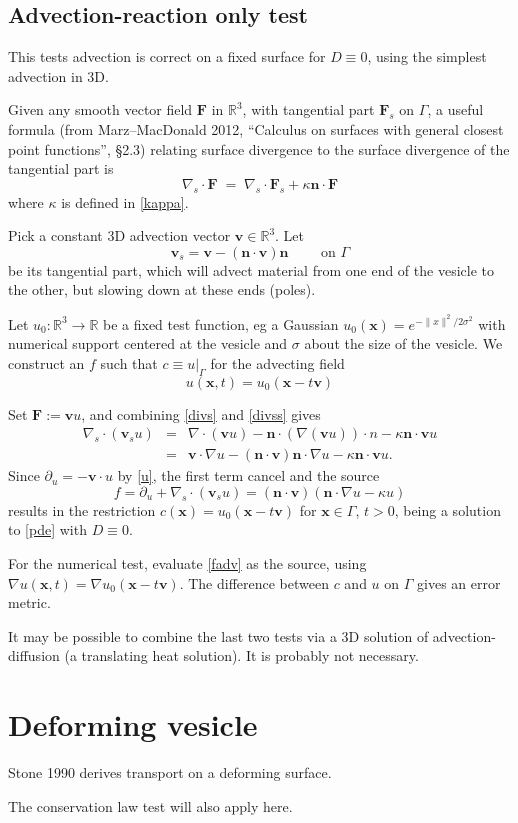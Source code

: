 \documentclass[11pt]{article}
\newcommand{\be}{\begin{equation}}
\newcommand{\ee}{\end{equation}}
\newcommand{\bea}{\begin{eqnarray}}
\newcommand{\eea}{\end{eqnarray}}
\newcommand{\mbf}[1]{{\mathbf #1}}
\newcommand{\R}{\mathbb{R}}
\newcommand{\x}{\mbf{x}}
\newcommand{\n}{\mbf{n}}
\newcommand{\vv}{\mbf{v}}
\begin{document}
\subsection{Advection-reaction only test}

This tests advection is correct on a fixed surface for $D\equiv 0$,
using the simplest advection in 3D.

Given any smooth vector field $\mbf{F}$ in $\R^3$, with tangential part
$\mbf{F}_s$ on $\Gamma$,
a useful formula (from Marz--MacDonald 2012, ``Calculus on surfaces with general closest point functions'', \S2.3)
relating surface divergence to the surface divergence of the tangential part is
\be
\nabla_s \cdot \mbf{F}
\;=\;
\nabla_s \cdot \mbf{F}_s + \kappa \n\cdot \mbf{F}
\label{divss}
\ee
where $\kappa$ is defined in \eqref{kappa}.

Pick a constant 3D advection vector $\vv\in\R^3$.
Let
$$
\vv_s = \vv - (\n\cdot\vv)\n  \qquad \mbox{ on } \Gamma
$$
be its tangential part, which will advect material
from one end of the vesicle to the other, but slowing down at these ends (poles).

Let $u_0:\R^3\to\R$ be a fixed test function, eg a Gaussian
$u_0(\x) = e^{-\|x\|^2/2\sigma^2}$ with numerical support centered at the vesicle
and $\sigma$ about the size of the vesicle.
We construct an $f$ such that $c \equiv u|_\Gamma$ for the advecting
field
\be
u(\x,t) = u_0(\x - t\vv)
\label{u}
\ee

Set $\mbf{F} := \vv u$, and combining \eqref{divs} and \eqref{divss}
gives
\bea
\nabla_s\cdot(\vv_s u) &=& \nabla\cdot (\vv u) - \n\cdot (\nabla(\vv u)) \cdot n
- \kappa \n \cdot\vv u
\nonumber\\
&=& \vv \cdot \nabla u - (\n\cdot\vv) \n\cdot \nabla u - \kappa \n \cdot \vv u.
\eea
Since $\partial_u = -\vv\cdot u$ by \eqref{u}, the first term cancel
and the source
\be
f = \partial_u + \nabla_s\cdot(\vv_s u) = (\n\cdot\vv)(\n\cdot \nabla u - \kappa u)
\label{fadv}
\ee
results in the restriction
$c(\x) = u_0(\x-t\vv)$ for $\x\in\Gamma$, $t>0$, being a
solution to \eqref{pde} with $D\equiv 0$.

For the numerical test,
evaluate \eqref{fadv} as the source, using
$\nabla u(\x,t) = \nabla u_0(\x-t\vv)$.
The difference between $c$ and $u$ on $\Gamma$ gives an error metric.

It may be possible to combine the last two tests via
a 3D solution of advection-diffusion (a translating heat solution).
It is probably not necessary.


\section{Deforming vesicle}

Stone 1990 derives transport on a deforming surface.

The conservation law test will also apply here.



%
%
\end{document}
